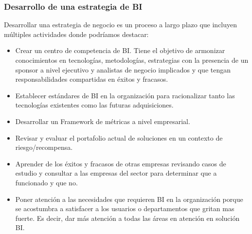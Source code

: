 \documentclass[preprint,12pt]{elsarticle}
\begin{document}
	\subsubsection{\textbf{Desarrollo de una estrategia de BI}}
	Desarrollar una estrategia de negocio es un proceso a largo plazo que incluyen múltiples actividades donde podríamos destacar:

	\begin{itemize}
	\item Crear un centro de competencia de BI. Tiene el objetivo de armonizar conocimientos en tecnologías, metodologías, estrategias 
	con la presencia de un sponsor a nivel ejecutivo y analistas de negocio implicados y que tengan responsabilidades compartidas en 
	éxitos y fracasos.
	\item Establecer estándares de BI en la organización para racionalizar tanto las tecnologías existentes como las futuras adquisiciones.
	\item Desarrollar un Framework de métricas a nivel empresarial.
	\item Revisar y evaluar el portafolio actual de soluciones en un contexto de riesgo/recompensa.
	\item Aprender de los éxitos y fracasos de otras empresas revisando casos de estudio y consultar a las empresas del sector para 
	determinar que a funcionado y que no.
	\item Poner atención a las necesidades que requieren BI en la organización porque se acostumbra a satisfacer a los usuarios o 
	departamentos que gritan mas fuerte. Es decir, dar más atención a todas las áreas en atención en solución BI.
	
	\end{itemize}



\end{document}
